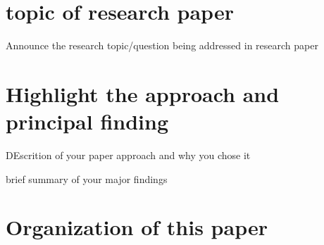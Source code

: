 \section{topic of research paper}
Announce the research topic/question being addressed in research paper


\section{Highlight the approach and principal finding}

DEscrition of your paper approach and why you chose it

brief summary of your major findings

\section{Organization of this paper}
